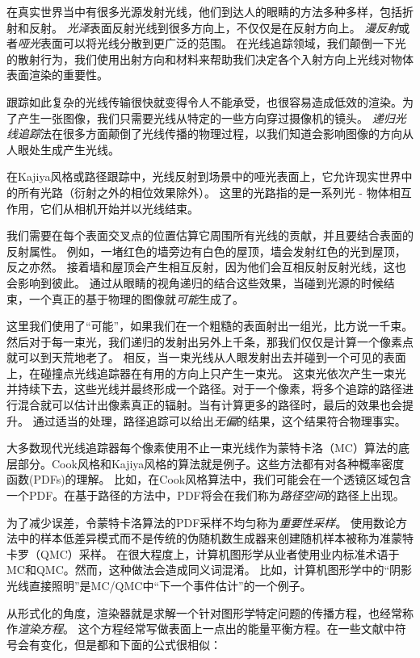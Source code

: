 \documentclass[12pt]{article}
\begin{document}
在真实世界当中有很多光源发射光线，他们到达人的眼睛的方法多种多样，包括折射和反射。
\textit{光泽}表面反射光线到很多方向上，不仅仅是在反射方向上。
\textit{漫反射}或者\textit{哑光}表面可以将光线分散到更广泛的范围。
在光线追踪领域，我们颠倒一下光的散射行为，我们使用出射方向和材料来帮助我们决定各个入射方向上光线对物体表面渲染的重要性。

跟踪如此复杂的光线传输很快就变得令人不能承受，也很容易造成低效的渲染。为了产生一张图像，我们只需要光线从特定的一些方向穿过摄像机的镜头。 
\textit{递归光线追踪}法在很多方面颠倒了光线传播的物理过程，以我们知道会影响图像的方向从人眼处生成产生光线。

在Kajiya风格或路径跟踪中，光线反射到场景中的哑光表面上，它允许现实世界中的所有光路（衍射之外的相位效果除外）。 
这里的光路指的是一系列光 - 物体相互作用，它们从相机开始并以光线结束。

我们需要在每个表面交叉点的位置估算它周围所有光线的贡献，并且要结合表面的反射属性。
例如，一堵红色的墙旁边有白色的屋顶，墙会发射红色的光到屋顶，反之亦然。 
接着墙和屋顶会产生相互反射，因为他们会互相反射反射光线，这也会影响到彼此。
通过从眼睛的视角递归的结合这些效果，当碰到光源的时候结束，一个真正的基于物理的图像就\textit{可能}生成了。

这里我们使用了“可能”，如果我们在一个粗糙的表面射出一组光，比方说一千束。
然后对于每一束光，我们递归的发射出另外上千条，那我们仅仅是计算一个像素点就可以到天荒地老了。
相反，当一束光线从人眼发射出去并碰到一个可见的表面上，在碰撞点光线追踪器在有用的方向上只产生一束光。
这束光依次产生一束光并持续下去，这些光线并最终形成一个路径。对于一个像素，将多个追踪的路径进行混合就可以估计出像素真正的辐射。当有计算更多的路径时，最后的效果也会提升。
通过适当的处理，路径追踪可以给出\textit{无偏}的结果，这个结果符合物理事实。

大多数现代光线追踪器每个像素使用不止一束光线作为蒙特卡洛（MC）算法的底层部分。Cook风格和Kajiya风格的算法就是例子。这些方法都有对各种概率密度函数(PDFs)的理解。
比如，在Cook风格算法中，我们可能会在一个透镜区域包含一个PDF。在基于路径的方法中，PDF将会在我们称为\textit{路径空间}的路径上出现。

为了减少误差，令蒙特卡洛算法的PDF采样不均匀称为\textit{重要性采样}。
使用数论方法中的样本低差异模式而不是传统的伪随机数生成器来创建随机样本被称为准蒙特卡罗（QMC）采样。
在很大程度上，计算机图形学从业者使用业内标准术语于MC和QMC。然而，这种做法会造成同义词混淆。
比如，计算机图形学中的“阴影光线直接照明”是MC/QMC中“下一个事件估计”的一个例子。

从形式化的角度，渲染器就是求解一个针对图形学特定问题的传播方程，也经常称作\textit{渲染方程}。 
这个方程经常写做表面上一点出的能量平衡方程。在一些文献中符号会有变化，但是都和下面的公式很相似：
\end{document}
